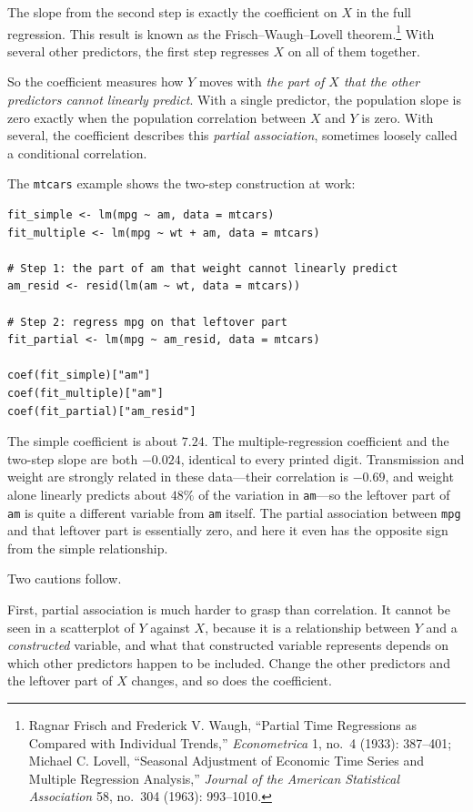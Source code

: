 \documentclass[11pt]{report}
\begin{document}
The slope from the second step is exactly the coefficient on \(X\) in the full regression. This result is known as the Frisch--Waugh--Lovell theorem.\footnote{Ragnar Frisch and Frederick V. Waugh, ``Partial Time Regressions as Compared with Individual Trends,'' \emph{Econometrica} 1, no.~4 (1933): 387--401; Michael C. Lovell, ``Seasonal Adjustment of Economic Time Series and Multiple Regression Analysis,'' \emph{Journal of the American Statistical Association} 58, no.~304 (1963): 993--1010.} With several other predictors, the first step regresses \(X\) on all of them together.

So the coefficient measures how \(Y\) moves with \emph{the part of \(X\) that the other predictors cannot linearly predict}. With a single predictor, the population slope is zero exactly when the population correlation between \(X\) and \(Y\) is zero. With several, the coefficient describes this \emph{partial association}, sometimes loosely called a conditional correlation.

The \texttt{mtcars} example shows the two-step construction at work:

\begin{lstlisting}
fit_simple <- lm(mpg ~ am, data = mtcars)
fit_multiple <- lm(mpg ~ wt + am, data = mtcars)

# Step 1: the part of am that weight cannot linearly predict
am_resid <- resid(lm(am ~ wt, data = mtcars))

# Step 2: regress mpg on that leftover part
fit_partial <- lm(mpg ~ am_resid, data = mtcars)

coef(fit_simple)["am"]
coef(fit_multiple)["am"]
coef(fit_partial)["am_resid"]
\end{lstlisting}

The simple coefficient is about \(7.24\). The multiple-regression coefficient and the two-step slope are both \(-0.024\), identical to every printed digit. Transmission and weight are strongly related in these data---their correlation is \(-0.69\), and weight alone linearly predicts about \(48\%\) of the variation in \texttt{am}---so the leftover part of \texttt{am} is quite a different variable from \texttt{am} itself. The partial association between \texttt{mpg} and that leftover part is essentially zero, and here it even has the opposite sign from the simple relationship.

Two cautions follow.

First, partial association is much harder to grasp than correlation. It cannot be seen in a scatterplot of \(Y\) against \(X\), because it is a relationship between \(Y\) and a \emph{constructed} variable, and what that constructed variable represents depends on which other predictors happen to be included. Change the other predictors and the leftover part of \(X\) changes, and so does the coefficient.
\end{document}
